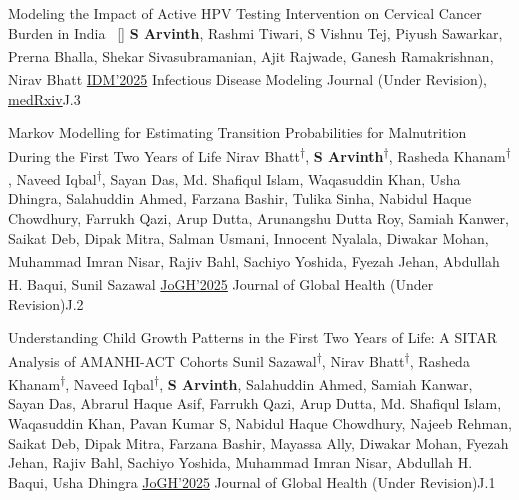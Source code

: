 





\begin{publications}

\publication
    {Modeling the Impact of Active HPV Testing Intervention on Cervical Cancer Burden in India}{~ [\href{https://www.medrxiv.org/content/10.1101/2025.07.29.25332380v1}{\small{\linkSymbol}}]}
    {\textbf{S Arvinth}, Rashmi Tiwari, S Vishnu Tej, Piyush Sawarkar, Prerna Bhalla, Shekar Sivasubramanian, Ajit Rajwade, Ganesh Ramakrishnan\textsuperscript{\scriptsize\Letter}, Nirav Bhatt\textsuperscript{\scriptsize\Letter}}
    {\href{https://www.sciencedirect.com/journal/infectious-disease-modelling}{IDM'2025}} {Infectious Disease Modeling Journal (Under Revision), \href{https://www.medrxiv.org/content/10.1101/2025.07.29.25332380v1}{medRxiv}}{\label{J3}J.3}

\publication
    {Markov Modelling for Estimating Transition Probabilities for Malnutrition During the First Two Years of Life}{}
    {Nirav Bhatt\textsuperscript{\scriptsize$\dagger$}, \textbf{S Arvinth}\textsuperscript{\scriptsize$\dagger$}, Rasheda Khanam\textsuperscript{\scriptsize$\dagger$}, Naveed Iqbal\textsuperscript{\scriptsize$\dagger$}, Sayan Das, Md. Shafiqul Islam, Waqasuddin Khan, Usha Dhingra, Salahuddin Ahmed, Farzana Bashir, Tulika Sinha, Nabidul Haque Chowdhury, Farrukh Qazi, Arup Dutta, Arunangshu Dutta Roy, Samiah Kanwer, Saikat Deb, Dipak Mitra, Salman Usmani, Innocent Nyalala, Diwakar Mohan, Muhammad Imran Nisar, Rajiv Bahl, Sachiyo Yoshida, Fyezah Jehan\textsuperscript{\scriptsize\Letter}, Abdullah H. Baqui\textsuperscript{\scriptsize\Letter}, Sunil Sazawal\textsuperscript{\scriptsize\Letter}}
    {\href{http://jogh.org}{JoGH'2025}} {Journal of Global Health (Under Revision)}{\label{J2}J.2}

\publication
    {Understanding Child Growth Patterns in the First Two Years of Life: A SITAR Analysis of AMANHI-ACT Cohorts}{}
    {Sunil Sazawal\textsuperscript{\scriptsize$\dagger$}\textsuperscript{\scriptsize\Letter}, Nirav Bhatt\textsuperscript{\scriptsize$\dagger$}, Rasheda Khanam\textsuperscript{\scriptsize$\dagger$}, Naveed Iqbal\textsuperscript{\scriptsize$\dagger$}, \textbf{S Arvinth}, Salahuddin Ahmed, Samiah Kanwar, Sayan Das, Abrarul Haque Asif, Farrukh Qazi, Arup Dutta, Md. Shafiqul Islam, Waqasuddin Khan, Pavan Kumar S, Nabidul Haque Chowdhury, Najeeb Rehman, Saikat Deb, Dipak Mitra, Farzana Bashir, Mayassa Ally, Diwakar Mohan, Fyezah Jehan, Rajiv Bahl, Sachiyo Yoshida, Muhammad Imran Nisar, Abdullah H. Baqui, Usha Dhingra}
    {\href{http://jogh.org}{JoGH'2025}} {Journal of Global Health (Under Revision)}{\label{J1}J.1}
\end{publications}
\vspace{-3mm}


